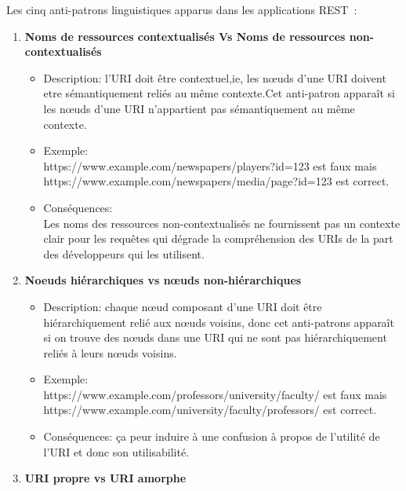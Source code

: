 Les cinq anti-patrons linguistiques  apparus dans les applications REST \cite{palma2015restful}:
\begin{enumerate}
    

\item \textbf{Noms de ressources contextualisés Vs Noms de ressources non-contextualisés}
\begin{itemize}
    

\item {Description}: l’URI doit être contextuel,ie, les nœuds d’une URI doivent etre sémantiquement reliés au même contexte.Cet anti-patron apparaît si les nœuds d’une URI n’appartient pas sémantiquement au même contexte.
\item Exemple: \\
https://www.example.com/newspapers/players?id=123  est faux mais \\
https://www.example.com/newspapers/media/page?id=123 est correct.
\item Conséquences:\\
Les noms des ressources non-contextualisés ne fournissent pas un contexte clair pour les requêtes qui dégrade la compréhension des URIs de la part des développeurs qui les utilisent.
\end{itemize}

\item \textbf{Noeuds hiérarchiques vs nœuds non-hiérarchiques}
\begin{itemize}
    

\item Description: chaque nœud composant d’une URI doit être hiérarchiquement relié aux nœuds voisins, donc cet anti-patrons apparaît si on trouve des nœuds dans une URI qui ne sont pas hiérarchiquement reliés  à leurs nœuds voisins.
\item Exemple:\\
https://www.example.com/professors/university/faculty/ est faux mais\\ https://www.example.com/university/faculty/professors/ est correct.
\item Conséquences: ça peur induire à une confusion à propos de l’utilité de l’URI et donc son utilisabilité.
\end{itemize}
\item \textbf{URI propre vs URI amorphe}
\begin{itemize}
    


\end{itemize}
\end{enumerate}
